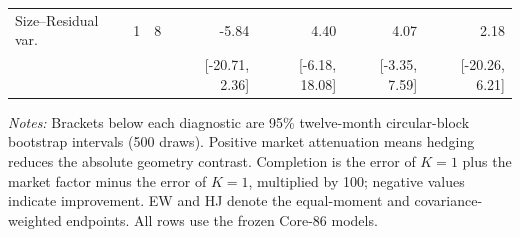 \begin{widetable}[!tbp]
\begin{minipage}{\textwidth}
\begin{tabular*}{\linewidth}{@{\extracolsep{\fill}}lccrrrr@{}}
Size--Residual var. & 1 & 8 & -5.84 & 4.40 & 4.07 & 2.18 \\
 &  &  & [-20.71, 2.36] & [-6.18, 18.08] & [-3.35, 7.59] & [-20.26, 6.21] \\
\bottomrule
\end{tabular*}
\par\vspace{4pt}
{\footnotesize\raggedright\textit{Notes:} Brackets below each diagnostic are 95\% twelve-month circular-block bootstrap intervals (500 draws). Positive market attenuation means hedging reduces the absolute geometry contrast. Completion is the error of $K=1$ plus the market factor minus the error of $K=1$, multiplied by 100; negative values indicate improvement. EW and HJ denote the equal-moment and covariance-weighted endpoints. All rows use the frozen Core-86 models.\par}
\end{minipage}
\end{widetable}
